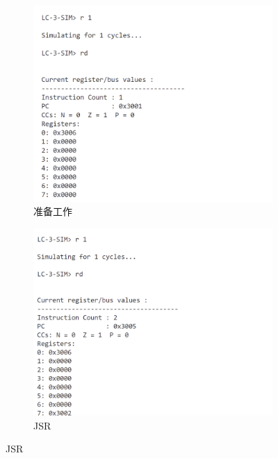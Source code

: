 \documentclass[UTF8]{ctexart}
\begin{document}
\begin{figure}[htbp]
  \centering
  \begin{subfigure}{0.45\textwidth}
    \includegraphics[width=\linewidth]{jsr1.png}
    \caption{准备工作}
  \end{subfigure}
  \hfill
  \begin{subfigure}{0.45\textwidth}
    \includegraphics[width=\linewidth]{jsr2.png}
    \caption{JSR}
  \end{subfigure}

  \vspace{0.5cm}


\end{figure}
\end{document}
